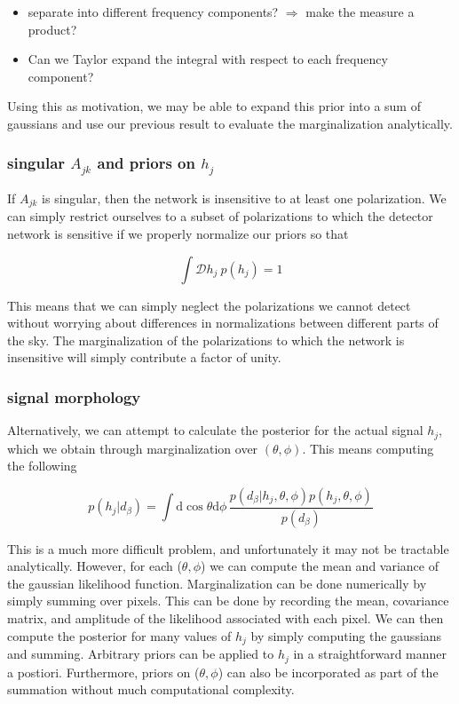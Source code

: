 \documentclass[10pt]{article}
\begin{document}
\begin{itemize}
	\item{separate into different frequency components? $\Rightarrow$ make the measure a product?}
	\item{Can we Taylor expand the integral with respect to each frequency component?}
\end{itemize}

Using this as motivation, we may be able to expand this prior into a sum of gaussians and use our previous result to evaluate the marginalization analytically.

\subsubsection{singular $A_{jk}$ and priors on $h_j$}

If $A_{jk}$ is singular, then the network is insensitive to at least one polarization. We can simply restrict ourselves to a subset of polarizations to which the detector network is sensitive if we properly normalize our priors so that

\begin{equation}
\int\mathcal{D}h_j\ p(h_j) = 1
\end{equation}

This means that we can simply neglect the polarizations we cannot detect without worrying about differences in normalizations between different parts of the sky. The marginalization of the polarizations to which the network is insensitive will simply contribute a factor of unity.


\subsubsection{signal morphology}

Alternatively, we can attempt to calculate the posterior for the actual signal $h_j$, which we obtain through marginalization over $(\theta, \phi)$. This means computing the following

\begin{equation}
p(h_j|d_\beta) = \int\mathrm{d}\cos\theta\mathrm{d}\phi\, \frac{p(d_\beta|h_j, \theta, \phi)p(h_j, \theta, \phi)}{p(d_\beta)}
\end{equation}

This is a much more difficult problem, and unfortunately it may not be tractable analytically. However, for each ($\theta,\phi$) we can compute the mean and variance of the gaussian likelihood function. Marginalization can be done numerically by simply summing over pixels. This can be done by recording the mean, covariance matrix, and amplitude of the likelihood associated with each pixel. We can then compute the posterior for many values of $h_j$ by simply computing the gaussians and summing. Arbitrary priors can be applied to $h_j$ in a straightforward manner a postiori. Furthermore, priors on ($\theta,\phi$) can also be incorporated as part of the summation without much computational complexity.
\end{document}
